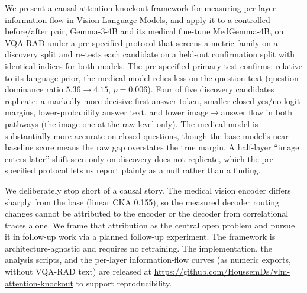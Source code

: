 We present a causal attention-knockout framework for measuring per-layer
information flow in Vision-Language Models, and apply it to a controlled before/after
pair, Gemma-3-4B and its medical fine-tune MedGemma-4B, on VQA-RAD under a
pre-specified protocol that screens a metric family on a discovery split and re-tests
each candidate on a held-out confirmation split with identical indices for both models.
The pre-specified primary test confirms: relative to its language prior, the medical
model relies less on the question text (question-dominance ratio $5.36 \to 4.15$,
$p{=}0.006$). Four of five discovery candidates replicate: a markedly more decisive
first answer token, smaller closed yes/no logit margins, lower-probability answer text,
and lower image$\to$answer flow in both pathways (the image one at the raw level only). The
medical model is substantially more accurate on closed questions, though the base
model's near-baseline score means the raw gap overstates the true margin. A half-layer
``image enters later'' shift seen
only on discovery does not replicate, which the pre-specified protocol lets us report plainly as
a null rather than a finding.

We deliberately stop short of a causal story. The medical vision encoder differs
sharply from the base (linear CKA 0.155), so the measured decoder routing changes
cannot be attributed to the encoder or the decoder from correlational traces alone.
We frame that attribution as the central open problem and pursue it in follow-up work
via a planned follow-up experiment. The framework is architecture-agnostic and
requires no retraining. The implementation, the analysis scripts, and the per-layer
information-flow curves (as numeric exports, without VQA-RAD text) are released at
\url{https://github.com/HoussemDs/vlm-attention-knockout} to support reproducibility.
